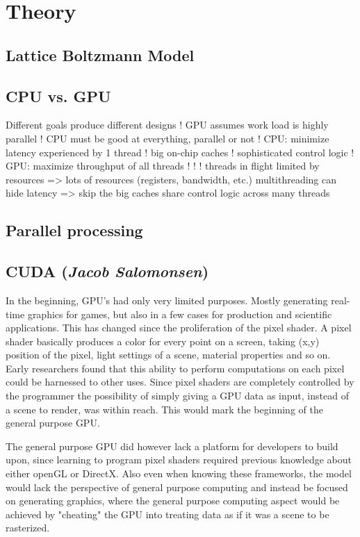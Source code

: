 \section{Theory}

\subsection{Lattice Boltzmann Model}

\subsection{CPU vs. GPU}
  Different goals produce different designs !   GPU assumes work load is highly parallel !   CPU must be good at everything, parallel or not
!   CPU: minimize latency experienced by 1 thread !   big on-chip caches !   sophisticated control logic
!   GPU: maximize throughput of all threads
!  
!   !  
threads in flight limited by resources => lots of resources (registers, bandwidth, etc.)
multithreading can hide latency => skip the big caches share control logic across many threads

\subsection{Parallel processing}

\subsection{CUDA (\textit{Jacob Salomonsen})}
In the beginning, GPU's had only very limited purposes. Mostly generating real-time graphics for games, but also in a few cases for production and scientific applications. This has changed since the proliferation of the pixel shader. A pixel shader basically produces a color for every point on a screen, taking (x,y) position of the pixel, light settings of a scene, material properties and so on. Early researchers found that this ability to perform computations on each pixel could be harnessed to other uses. Since pixel shaders are completely controlled by the programmer the possibility of simply giving a GPU data as input, instead of a scene to render, was within reach. This would mark the beginning of the general purpose GPU.

The general purpose GPU did however lack a platform for developers to build upon, since learning to program pixel shaders required previous knowledge about either openGL or DirectX. Also even when knowing these frameworks, the model would lack the perspective of general purpose computing and instead be focused on generating graphics, where the general purpose computing aspect would be achieved by "cheating" the GPU into treating data as if it was a scene to be rasterized.

